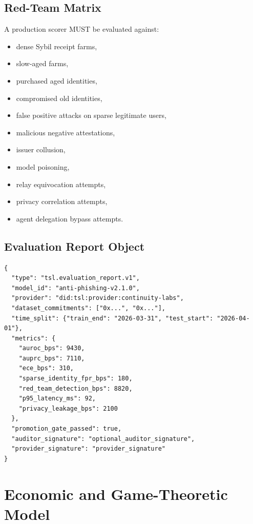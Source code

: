 \documentclass[11pt]{article}
\begin{document}
\subsection{Red-Team Matrix}

A production scorer MUST be evaluated against:

\begin{itemize}
    \item dense Sybil receipt farms,
    \item slow-aged farms,
    \item purchased aged identities,
    \item compromised old identities,
    \item false positive attacks on sparse legitimate users,
    \item malicious negative attestations,
    \item issuer collusion,
    \item model poisoning,
    \item relay equivocation attempts,
    \item privacy correlation attempts,
    \item agent delegation bypass attempts.
\end{itemize}

\subsection{Evaluation Report Object}

\begin{lstlisting}[style=tslcode]
{
  "type": "tsl.evaluation_report.v1",
  "model_id": "anti-phishing-v2.1.0",
  "provider": "did:tsl:provider:continuity-labs",
  "dataset_commitments": ["0x...", "0x..."],
  "time_split": {"train_end": "2026-03-31", "test_start": "2026-04-01"},
  "metrics": {
    "auroc_bps": 9430,
    "auprc_bps": 7110,
    "ece_bps": 310,
    "sparse_identity_fpr_bps": 180,
    "red_team_detection_bps": 8820,
    "p95_latency_ms": 92,
    "privacy_leakage_bps": 2100
  },
  "promotion_gate_passed": true,
  "auditor_signature": "optional_auditor_signature",
  "provider_signature": "provider_signature"
}
\end{lstlisting}

\section{Economic and Game-Theoretic Model}
\end{document}
